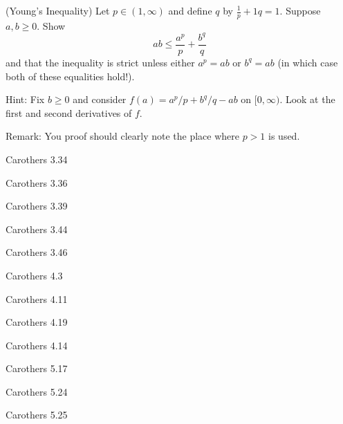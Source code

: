 \documentclass[minion]{homework641}
\begin{document}
\begin{aproblems}

\hproblem (Young's Inequality)
Let $p\in (1,\infty)$ and define $q$ by $\frac{1}{p}+{1}{q}=1$.  
Suppose $a,b\ge 0$.  Show
\[
ab \le \frac{a^p }{p} + \frac{b^q }{q}
\]
and that the inequality is strict unless either $a^{p}=ab$ or $b^{q}=ab$
(in which case both of these equalities hold!).

Hint: Fix $b\ge0$ and
consider $f(a)=a^p/p+b^q/q-ab$ on $[0,\infty)$.  Look at the first and
second derivatives of $f$.

Remark: You proof should clearly note the place where $p>1$ is used.

\hproblem Carothers 3.34

\hproblem Carothers 3.36

\hproblem Carothers 3.39

\hproblem Carothers 3.44

\hproblem Carothers 3.46

\hproblem Carothers 4.3

\hproblem Carothers 4.11

\hproblem Carothers 4.19

\hproblem Carothers 4.14

\hproblem Carothers 5.17

\hproblem Carothers 5.24

\hproblem Carothers 5.25

\end{aproblems}
\end{document}
